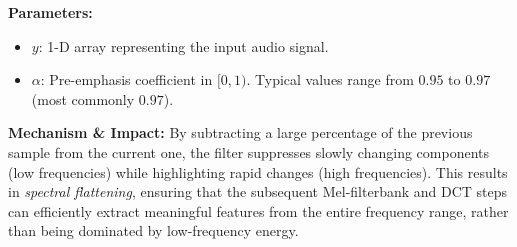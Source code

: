\textbf{Parameters:}
\begin{itemize}
    \item $y$: 1-D array representing the input audio signal.
    \item $\alpha$: Pre-emphasis coefficient in $[0, 1)$. Typical values range from $0.95$ to $0.97$ (most commonly $0.97$).
\end{itemize}

\textbf{Mechanism \& Impact:} 
By subtracting a large percentage of the previous sample from the current one, the filter suppresses slowly changing components (low frequencies) while highlighting rapid changes (high frequencies). This results in \textit{spectral flattening}, ensuring that the subsequent Mel-filterbank and DCT steps can efficiently extract meaningful features from the entire frequency range, rather than being dominated by low-frequency energy.
